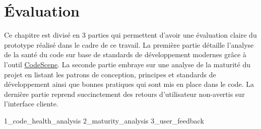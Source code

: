 \section{Évaluation}

Ce chapitre est divisé en 3 parties qui permettent d'avoir une évaluation claire du prototype réalisé dans le cadre de ce travail.
La première partie détaille l'analyse de la santé du code sur base de standards de développement modernes grâce à l'outil \href{https://codescene.io/}{CodeScene}.
La seconde partie embraye sur une analyse de la maturité du projet en listant les patrons de conception, principes et standards de développement ainsi que bonnes pratiques qui sont mis en place dans le code.
La dernière partie reprend succinctement des retours d'utilisateur non-avertis sur l'interface cliente.

{1_code_health_analysis}
{2_maturity_analysis}
{3_user_feedback}
